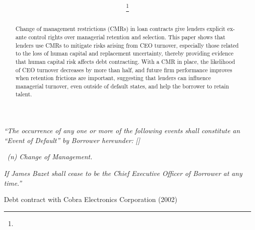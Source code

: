 \documentclass[a4paper,12pt]{article}
\title{\textbf{\USRVarTitle}}
\author{\USRVarAuthors\thanks{\USRVarThanks}}
\def \USRVarAbstract {%
Change of management restrictions (CMRs) in loan contracts give lenders explicit ex-ante control rights over managerial retention and selection.
This paper shows that lenders use CMRs to mitigate risks arising from CEO turnover, especially those related to the loss of human capital and replacement uncertainty, thereby providing evidence that human capital risk affects debt contracting.
With a CMR in place, the likelihood of CEO turnover decreases by more than half, and future firm performance improves when retention frictions are important, suggesting that lenders can influence managerial turnover, even outside of default states, and help the borrower to retain talent.
}
\begin{document}
\maketitle


\begin{abstract}
\noindent \USRVarAbstract
\end{abstract}





{}
\label{section:introduction}

{\singlespacing
%
\noindent
\textit{``The occurrence of any one or more of the following events shall constitute an ``Event of Default'' by Borrower hereunder:} \textit{[\textellipsis]}

\noindent \ \textit{(n) Change of Management.}

\indent \textit{If James Bazet shall cease to be the Chief Executive Officer of Borrower at any time.''}
%
\begin{flushright}
Debt contract with Cobra Electronics Corporation (2002)
\end{flushright}
}
\end{document}

